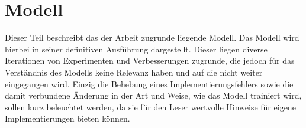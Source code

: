 \chapter{Modell}
\label{ch:model}

Dieser Teil beschreibt das der Arbeit zugrunde liegende Modell.
Das Modell wird hierbei in seiner definitiven Ausführung dargestellt.
Dieser liegen diverse Iterationen von Experimenten und Verbesserungen zugrunde, die jedoch für das Verständnis des Modells keine Relevanz haben und auf die nicht weiter eingegangen wird.
Einzig die Behebung eines Implementierungsfehlers sowie die damit verbundene Änderung in der Art und Weise, wie das Modell trainiert wird, sollen kurz beleuchtet werden, da sie für den Leser wertvolle Hinweise für eigene Implementierungen bieten können.





